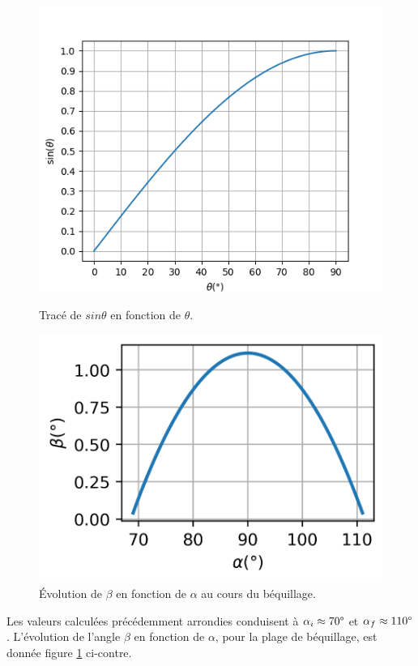 \begin{figure}[!ht]
\begin{minipage}{0.55\linewidth}
\begin{center}
\includegraphics[width=0.9\linewidth]{img/fig04a}
\caption{\label{fig04a}Tracé de $sin\theta$ en fonction de $\theta$.}
\end{center}
\end{minipage}
\begin{minipage}{0.5\linewidth}
\begin{center}
\includegraphics[width=0.7\linewidth]{img/fig04b}
\caption{\label{fig04b}Évolution de $\beta$ en fonction de $\alpha$ au cours du béquillage.}
\end{center}
\end{minipage}
\end{figure}

Les valeurs calculées précédemment arrondies conduisent à $\alpha_i\approx 70\degree$ et $\alpha_f\approx 110\degree$. L'évolution de l'angle $\beta$ en fonction de $\alpha$, pour la plage de béquillage, est donnée figure \ref{fig04b} ci-contre.

